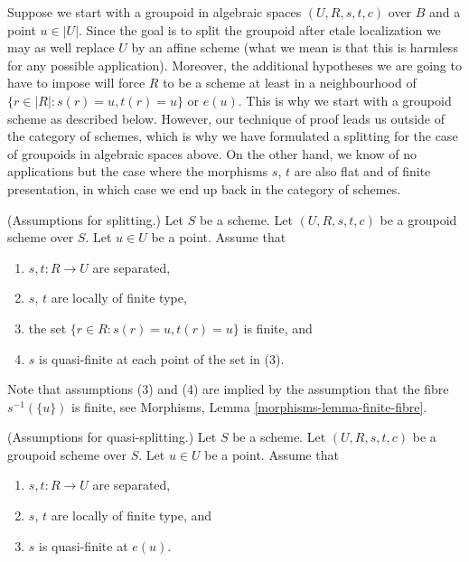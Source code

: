 \medskip\noindent
Suppose we start with a groupoid in algebraic spaces
$(U, R, s, t, c)$ over $B$ and a point $u \in |U|$.
Since the goal is to split the groupoid after etale localization
we may as well replace $U$ by an affine scheme (what we mean
is that this is harmless for any possible application).
Moreover, the additional hypotheses we are going to have
to impose will force $R$ to be a scheme at least in a neighbourhood
of $\{r \in |R| : s(r) = u, t(r) = u\}$ or $e(u)$. This is why
we start with a groupoid scheme as described below.
However, our technique of proof leads us outside of the category of schemes,
which is why we have formulated a splitting for the case of groupoids
in algebraic spaces above.
On the other hand, we know of no applications but
the case where the morphisms $s$, $t$
are also flat and of finite presentation, in which case
we end up back in the category of schemes.

\begin{situation}
\label{situation-etale-localize}
(Assumptions for splitting.)
Let $S$ be a scheme.
Let $(U, R, s, t, c)$ be a groupoid scheme over $S$.
Let $u \in U$ be a point. Assume that
\begin{enumerate}
\item $s, t : R \to U$ are separated,
\item $s$, $t$ are locally of finite type,
\item the set $\{r \in R : s(r) = u, t(r) = u\}$ is finite, and
\item $s$ is quasi-finite at each point of the set in (3).
\end{enumerate}
Note that assumptions (3) and (4) are implied by the assumption
that the fibre $s^{-1}(\{u\})$ is finite, see
Morphisms, Lemma \ref{morphisms-lemma-finite-fibre}.
\end{situation}

\begin{situation}
\label{situation-etale-localize-quasi}
(Assumptions for quasi-splitting.)
Let $S$ be a scheme.
Let $(U, R, s, t, c)$ be a groupoid scheme over $S$.
Let $u \in U$ be a point. Assume that
\begin{enumerate}
\item $s, t : R \to U$ are separated,
\item $s$, $t$ are locally of finite type, and
\item $s$ is quasi-finite at $e(u)$.
\end{enumerate}
\end{situation}

